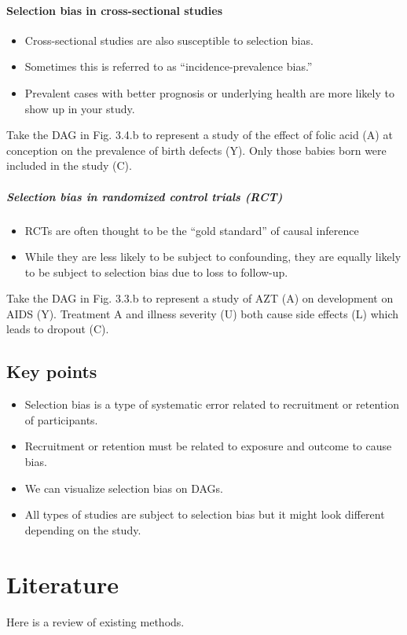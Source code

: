 \documentclass[
]{book}
\providecommand{\tightlist}{%
  \setlength{\itemsep}{0pt}\setlength{\parskip}{0pt}}
\begin{document}
\hypertarget{selection-bias-in-cross-sectional-studies}{%
\subsubsection{Selection bias in cross-sectional studies}\label{selection-bias-in-cross-sectional-studies}}

\begin{itemize}
\tightlist
\item
  Cross-sectional studies are also susceptible to selection bias.
\item
  Sometimes this is referred to as ``incidence-prevalence bias.''
\item
  Prevalent cases with better prognosis or underlying health are more likely to show up in your study.
\end{itemize}

Take the DAG in Fig. 3.4.b to represent a study of the effect of folic acid (A) at conception on the prevalence of birth defects (Y). Only those babies born were included in the study (C).

\hypertarget{selection-bias-in-randomized-control-trials-rct}{%
\paragraph{Selection bias in randomized control trials (RCT)}\label{selection-bias-in-randomized-control-trials-rct}}

\begin{itemize}
\tightlist
\item
  RCTs are often thought to be the ``gold standard'' of causal inference
\item
  While they are less likely to be subject to confounding, they are equally likely to be subject to selection bias due to loss to follow-up.
\end{itemize}

Take the DAG in Fig. 3.3.b to represent a study of AZT (A) on development on AIDS (Y). Treatment A and illness severity (U) both cause side effects (L) which leads to dropout (C).

\hypertarget{key-points}{%
\section{Key points}\label{key-points}}

\begin{itemize}
\tightlist
\item
  Selection bias is a type of systematic error related to recruitment or retention of participants.
\item
  Recruitment or retention must be related to exposure and outcome to cause bias.
\item
  We can visualize selection bias on DAGs.
\item
  All types of studies are subject to selection bias but it might look different depending on the study.
\end{itemize}

\hypertarget{literature}{%
\chapter{Literature}\label{literature}}

Here is a review of existing methods.

  
\end{document}
